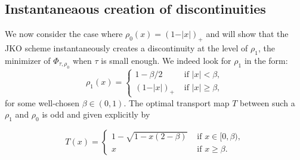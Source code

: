 \documentclass[12pt, a4paper]{article}
\numberwithin{equation}{section}
\theoremstyle{plain}
\theoremstyle{definition}
\theoremstyle{remark}
\begin{document}





\subsection{Instantaneaous creation of discontinuities}\label{subsec-discont}


We now consider the case where $\rho_0(x)=(1-\vert x\vert)_+$ and will show that the JKO scheme instantaneously creates a discontinuity at the level of $\rho_1$, the minimizer of $\Phi_{\tau, \rho_0}$  when $\tau$ is small enough. We indeed look for $\rho_1$ in the form:
\[\rho_1(x) = \begin{cases}
1-\beta/2  &\mbox{ if $\vert x\vert <   \beta$}, \\
(1-\vert x \vert)_+  &\mbox{ if $\vert x\vert \ge   \beta$,}  \end{cases}\]
for some well-chosen $\beta\in (0,1)$. The optimal transport map $T$ between such a $\rho_1$ and $\rho_0$ is odd and given explicitly by

\[T(x)=\begin{cases}
1-\sqrt{1-x(2-\beta)}  &\mbox{ if $x \in [0,\beta)$},\\
x  & \mbox{ if $x\ge \beta$}. \end{cases}\]
\end{document}
